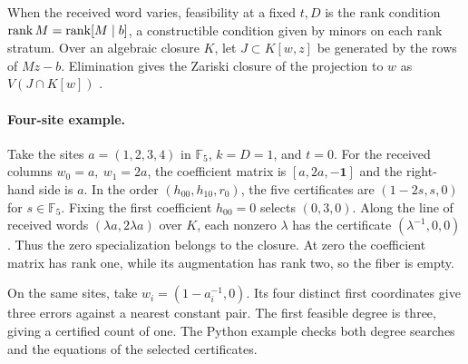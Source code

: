When the received word varies, feasibility at a fixed \(t,D\) is the
rank condition \(\operatorname{rank} M=\operatorname{rank}[M\mid b]\), a constructible condition
given by minors on each rank stratum. Over an algebraic closure \(K\),
let \(J\subset K[w,z]\) be generated by the rows of \(Mz-b\).
Elimination gives the Zariski closure of the projection to \(w\) as
\(V(J\cap K[w])\) \cite[Section~8]{paperthreeagreement}.

\paragraph{Four-site example.}
Take the sites \(a=(1,2,3,4)\) in \(\mathbb F_5\), \(k=D=1\), and \(t=0\).
For the received columns \(w_0=a,\ w_1=2a\), the coefficient matrix is
\([a,2a,-\mathbf 1]\) and the right-hand side is \(a\). In the order
\((h_{00},h_{10},r_0)\), the five certificates are
\((1-2s,s,0)\) for \(s\in\mathbb F_5\). Fixing the first coefficient
\(h_{00}=0\) selects \((0,3,0)\). Along the line of received words
\((\lambda a,2\lambda a)\) over \(K\), each nonzero \(\lambda\) has the
certificate \((\lambda^{-1},0,0)\). Thus the zero specialization belongs
to the closure. At zero the coefficient matrix has rank one, while its
augmentation has rank two, so the fiber is empty.

On the same sites, take \(w_i=(1-a_i^{-1},0)\). Its four distinct
first coordinates give three errors against a nearest constant pair.
The first feasible degree is three, giving a certified count of one.
The Python example checks both degree searches and the equations of
the selected certificates.
